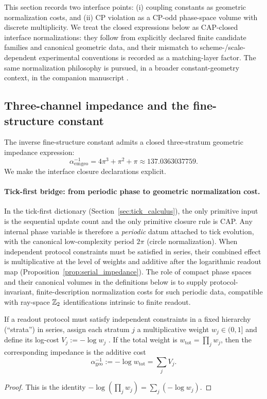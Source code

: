 
This section records two interface points: (i) coupling constants as geometric normalization costs, and (ii) CP violation as a CP-odd phase-space volume with discrete multiplicity.
We treat the closed expressions below as CAP-closed interface normalizations: they follow from explicitly declared finite candidate families and canonical geometric data, and their mismatch to scheme-/scale-dependent experimental conventions is recorded as a matching-layer factor.
The same normalization philosophy is pursued, in a broader constant-geometry context, in the companion manuscript \cite{Ma2025PCG}.

\subsection{Three-channel impedance and the fine-structure constant}
\label{subsec:alpha_impedance}

The inverse fine-structure constant admits a closed three-stratum geometric impedance expression:
\begin{equation}\label{eq:alpha_geo}
\alpha_{\mathrm{em}}^{-1}{}_{\mathrm{geo}}=4\pi^3+\pi^2+\pi\approx 137.0363037759.
\end{equation}
We make the interface closure declarations explicit.

\paragraph{Tick-first bridge: from periodic phase to geometric normalization cost.}
In the tick-first dictionary (Section~\ref{sec:tick_calculus}), the only primitive input is the sequential update count and the only primitive closure rule is CAP.
Any internal phase variable is therefore a \emph{periodic} datum attached to tick evolution, with the canonical low-complexity period $2\pi$ (circle normalization).
When independent protocol constraints must be satisfied in series, their combined effect is multiplicative at the level of weights and additive after the logarithmic readout map (Proposition~\ref{prop:serial_impedance}).
The role of compact phase spaces and their canonical volumes in the definitions below is to supply protocol-invariant, finite-description normalization costs for such periodic data, compatible with ray-space $\mathbb{Z}_2$ identifications intrinsic to finite readout.

\begin{proposition}\label{prop:serial_impedance}
If a readout protocol must satisfy independent constraints in a fixed hierarchy (``strata'') in series, assign each stratum $j$ a multiplicative weight $w_j\in(0,1]$ and define its log-cost $V_j:=-\log w_j$ \cite{Shannon1948,CoverThomas2006}.
If the total weight is $w_{\mathrm{tot}}=\prod_j w_j$, then the corresponding impedance is the additive cost
\[
\alpha_{\mathrm{geo}}^{-1}:=-\log w_{\mathrm{tot}}=\sum_j V_j.
\]
\end{proposition}
\begin{proof}
This is the identity $-\log\!\left(\prod_j w_j\right)=\sum_j (-\log w_j)$.
\end{proof}

